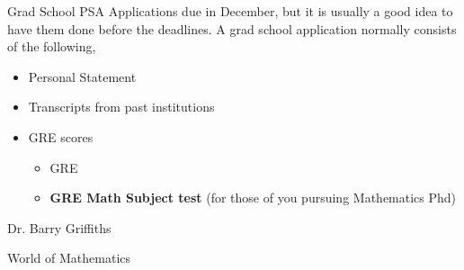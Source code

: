 \documentclass[xcolor=dvipsnames]{beamer}
\begin{document}
\begin{frame}{Grad School PSA}
Applications due in December, but it is usually a good idea to have them done before the deadlines. A grad school application normally consists of the following, 
\begin{itemize}
\item Personal Statement
\item Transcripts from past institutions
\item GRE scores
\begin{itemize}
\item GRE 
\item \textbf{GRE Math Subject test }(for those of you pursuing Mathematics Phd) 

\end{itemize}
\end{itemize}
\end{frame}

\begin{frame}
\centering \Huge Dr. Barry Griffiths 


\vspace{1cm}


\centering \Huge World of Mathematics 



\end{frame}
\end{document}
